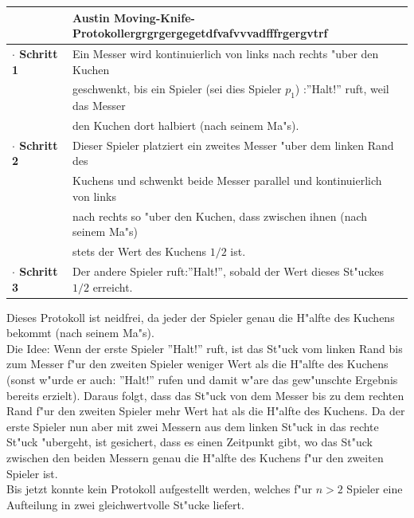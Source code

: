\documentclass[11pt, a4paper, twoside]{article}
\newcommand{\wf}{\color{white}}
\newcommand{\tf}{\color{black}}
\numberwithin{equation}{section}
\begin{document}
\newline
\begin{tabular}{|ll|}
\hline
&\textbf{Austin Moving-Knife-Protokoll}\wf ergrgrgergegetdfvafvvvadfffrgergvtrf\tf\\
\hline
\textbf{$\cdot$ Schritt 1}& Ein Messer wird kontinuierlich von links nach rechts "uber den Kuchen\\&geschwenkt, bis ein Spieler (sei dies Spieler $p_1$) :''Halt!'' ruft, weil das Messer\\&den Kuchen dort halbiert (nach seinem Ma"s).\\
\textbf{$\cdot$ Schritt 2}& Dieser Spieler platziert ein zweites Messer "uber dem linken Rand des\\&Kuchens und schwenkt beide Messer parallel und kontinuierlich von links\\&nach rechts so "uber den Kuchen, dass zwischen ihnen (nach seinem Ma"s)\\&stets der Wert des Kuchens $1/2$ ist.\\
\textbf{$\cdot$ Schritt 3}& Der andere Spieler ruft:''Halt!'', sobald der Wert dieses St"uckes $1/2$ erreicht.\\
\hline
\end{tabular}
\newline
\newline
\newline
 Dieses Protokoll ist neidfrei, da jeder der Spieler genau die H"alfte des Kuchens bekommt (nach seinem Ma"s).\\Die Idee: Wenn der erste Spieler ''Halt!'' ruft, ist das St"uck vom linken Rand bis zum Messer f"ur den zweiten Spieler weniger Wert als die H"alfte des Kuchens (sonst w"urde er auch: ''Halt!'' rufen und damit w"are das gew"unschte Ergebnis bereits erzielt). Daraus folgt, dass das St"uck von dem Messer bis zu dem rechten Rand f"ur den zweiten Spieler mehr Wert hat als die H"alfte des Kuchens. Da der erste Spieler nun aber mit zwei Messern aus dem linken St"uck in das rechte St"uck "ubergeht, ist gesichert, dass es einen Zeitpunkt gibt, wo das St"uck zwischen den beiden Messern genau die H"alfte des Kuchens f"ur den zweiten Spieler ist.\\
Bis jetzt konnte kein Protokoll aufgestellt werden, welches f"ur $n>2$ Spieler eine Aufteilung in zwei gleichwertvolle St"ucke liefert.
\end{document}
